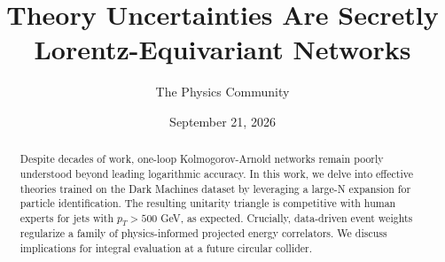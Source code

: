 \documentclass[11pt]{article}
\title{Theory Uncertainties Are Secretly Lorentz-Equivariant Networks}
\author{The Physics Community}
\date{September 21, 2026}
\begin{document}
\maketitle
\begin{abstract}
Despite decades of work, one-loop Kolmogorov-Arnold networks remain
poorly understood beyond leading logarithmic accuracy. In this work, we
delve into effective theories trained on the Dark Machines dataset by
leveraging a large-N expansion for particle identification. The
resulting unitarity triangle is competitive with human experts for jets
with $p_T > 500$ GeV, as expected. Crucially, data-driven event weights
regularize a family of physics-informed projected energy correlators. We
discuss implications for integral evaluation at a future circular
collider.
\end{abstract}
\tableofcontents



\nocite{*}


\end{document}
